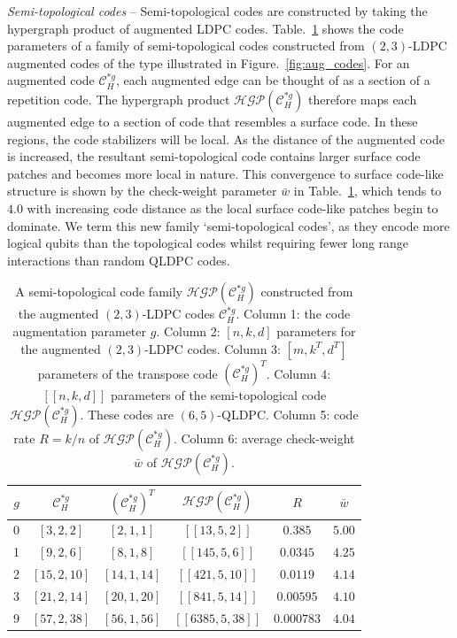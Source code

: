 \documentclass[%
 reprint,
superscriptaddress,
nofootinbib,
 amsmath,amssymb,
secnumarabic
]{revtex4-1}
\begin{document}
\textit{Semi-topological codes} -- Semi-topological codes are constructed by taking the hypergraph product of augmented LDPC codes. Table.~\ref{tab:aug_codes} shows the code parameters of a family of semi-topological codes constructed from $(2,3)$-LDPC augmented codes of the type illustrated in Figure.~\ref{fig:aug_codes}. For an augmented code $\mathcal{C}_H^{*g}$, each augmented edge can be thought of as a section of a repetition code. The hypergraph product $\mathcal{HGP}(\mathcal{C}_H^{*g})$ therefore maps each augmented edge to a section of code that resembles a surface code. In these regions, the code stabilizers will be local. As the distance of the augmented code is increased, the resultant semi-topological code contains larger surface code patches and becomes more local in nature. This convergence to surface code-like structure is shown by the check-weight parameter $\bar{w}$ in Table.~\ref{tab:aug_codes}, which tends to $4.0$ with increasing code distance as the local surface code-like patches begin to dominate. We term this new family `semi-topological codes', as they encode more logical qubits than the topological codes whilst requiring fewer long range interactions than random QLDPC codes.

\begin{table} 
	\renewcommand{\arraystretch}{1.2}
	
	\begin{tabular}{c c c | c c c}
		$g$ & $\mathcal{C}_H^{*g}$ & $(\mathcal{C}_H^{*g})^T$ & $\mathcal{HGP}(\mathcal{C}_H^{*g})$ & $R$ & $\bar{w}$ \\ \hline
		0  &$[3,2,2]$ & $[2,1,1]$ & $[[13,5,2]]$ & $0.385$ & $5.00$ \\
		1 &$[9,2,6]$  & $[8,1,8]$ & $[[145,5,6]]$ & $ 0.0345$& $4.25$ \\
		2 &$[15,2,10]$ & $[14,1,14]$ & $[[421,5,10]]$ & $0.0119$& $4.14$ \\
		3 &$[21,2,14]$ & $[20,1,20]$ & $[[841,5,14]]$ & $0.00595$& $4.10$ \\
		9 &$[57,2,38]$ & $[56,1,56]$& $[[6385,5,38]]$ & $0.000783$& $4.04$ \\
	\end{tabular}
\caption{A semi-topological code family $\mathcal{HGP}(\mathcal{C}_H^{*g})$ constructed from the augmented $(2,3)$-LDPC codes $\mathcal{C}_H^{*g}$. Column 1: the code augmentation parameter $g$. Column 2: $[n,k,d]$ parameters for the augmented $(2,3)$-LDPC codes. Column 3: $[m,k^T,d^T]$ parameters of the transpose code $(\mathcal{C}_H^{*g})^T$. Column 4: $[[n,k,d]]$ parameters of the semi-topological code $\mathcal{HGP}(\mathcal{C}_H^{*g})$. These codes are $(6,5)$-QLDPC. Column 5: code rate $R=k/n$ of $\mathcal{HGP}(\mathcal{C}_H^{*g})$. Column 6: average check-weight $\bar{w}$ of $\mathcal{HGP}(\mathcal{C}_H^{*g})$.}

\label{tab:aug_codes}

\end{table}
\end{document}
